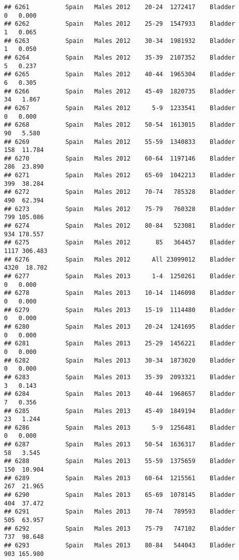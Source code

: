 \documentclass[
]{article}
\begin{document}
\begin{verbatim}
## 6261          Spain   Males 2012    20-24  1272417    Bladder      0   0.000
## 6262          Spain   Males 2012    25-29  1547933    Bladder      1   0.065
## 6263          Spain   Males 2012    30-34  1981932    Bladder      1   0.050
## 6264          Spain   Males 2012    35-39  2107352    Bladder      5   0.237
## 6265          Spain   Males 2012    40-44  1965304    Bladder      6   0.305
## 6266          Spain   Males 2012    45-49  1820735    Bladder     34   1.867
## 6267          Spain   Males 2012      5-9  1233541    Bladder      0   0.000
## 6268          Spain   Males 2012    50-54  1613015    Bladder     90   5.580
## 6269          Spain   Males 2012    55-59  1340833    Bladder    158  11.784
## 6270          Spain   Males 2012    60-64  1197146    Bladder    286  23.890
## 6271          Spain   Males 2012    65-69  1042213    Bladder    399  38.284
## 6272          Spain   Males 2012    70-74   785328    Bladder    490  62.394
## 6273          Spain   Males 2012    75-79   760328    Bladder    799 105.086
## 6274          Spain   Males 2012    80-84   523081    Bladder    934 178.557
## 6275          Spain   Males 2012       85   364457    Bladder   1117 306.483
## 6276          Spain   Males 2012      All 23099012    Bladder   4320  18.702
## 6277          Spain   Males 2013      1-4  1250261    Bladder      0   0.000
## 6278          Spain   Males 2013    10-14  1146098    Bladder      0   0.000
## 6279          Spain   Males 2013    15-19  1114480    Bladder      0   0.000
## 6280          Spain   Males 2013    20-24  1241695    Bladder      0   0.000
## 6281          Spain   Males 2013    25-29  1456221    Bladder      0   0.000
## 6282          Spain   Males 2013    30-34  1873020    Bladder      0   0.000
## 6283          Spain   Males 2013    35-39  2093321    Bladder      3   0.143
## 6284          Spain   Males 2013    40-44  1968657    Bladder      7   0.356
## 6285          Spain   Males 2013    45-49  1849194    Bladder     23   1.244
## 6286          Spain   Males 2013      5-9  1256481    Bladder      0   0.000
## 6287          Spain   Males 2013    50-54  1636317    Bladder     58   3.545
## 6288          Spain   Males 2013    55-59  1375659    Bladder    150  10.904
## 6289          Spain   Males 2013    60-64  1215561    Bladder    267  21.965
## 6290          Spain   Males 2013    65-69  1078145    Bladder    404  37.472
## 6291          Spain   Males 2013    70-74   789593    Bladder    505  63.957
## 6292          Spain   Males 2013    75-79   747102    Bladder    737  98.648
## 6293          Spain   Males 2013    80-84   544043    Bladder    903 165.980

\end{verbatim}
\end{document}
